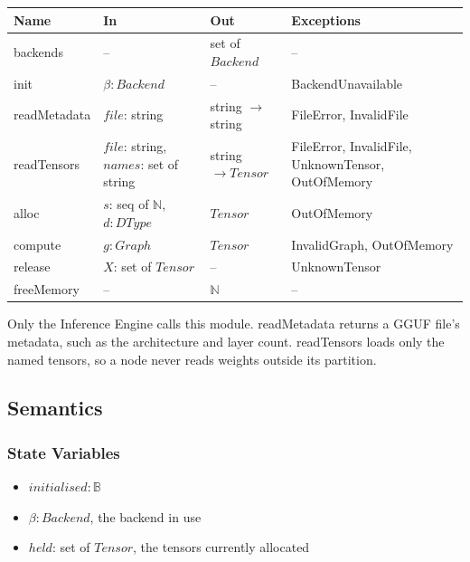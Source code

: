 \documentclass[12pt, titlepage]{article}
\begin{document}
\begin{center}
\begin{tabular}{p{2.6cm} p{4.4cm} p{2.6cm} p{4.0cm}}
\toprule
\textbf{Name} & \textbf{In} & \textbf{Out} & \textbf{Exceptions} \\
\midrule
backends & -- & set of $\mathit{Backend}$ & -- \\
init & $\beta: \mathit{Backend}$ & -- & BackendUnavailable \\
readMetadata & $\mathit{file}$: string & string $\to$ string & FileError,
  InvalidFile \\
readTensors & $\mathit{file}$: string, $\mathit{names}$: set of string &
  string $\to \mathit{Tensor}$ & FileError, InvalidFile, UnknownTensor,
  OutOfMemory \\
alloc & $s$: seq of $\mathbb{N}$, $d: \mathit{DType}$ & $\mathit{Tensor}$ &
  OutOfMemory \\
compute & $g: \mathit{Graph}$ & $\mathit{Tensor}$ & InvalidGraph, OutOfMemory
  \\
release & $X$: set of $\mathit{Tensor}$ & -- & UnknownTensor \\
freeMemory & -- & $\mathbb{N}$ & -- \\
\bottomrule
\end{tabular}
\end{center}

{\raggedright \noindent Only the Inference Engine calls this module.
readMetadata returns a GGUF file's metadata, such as the architecture and
layer count. readTensors loads only the named tensors, so a node never reads
weights outside its partition.\par}

\subsection{Semantics}

\subsubsection{State Variables}

\begin{itemize}
  \item $\mathit{initialised}: \mathbb{B}$
  \item $\beta: \mathit{Backend}$, the backend in use
  \item $\mathit{held}$: set of $\mathit{Tensor}$, the tensors currently
    allocated
\end{itemize}
\end{document}
